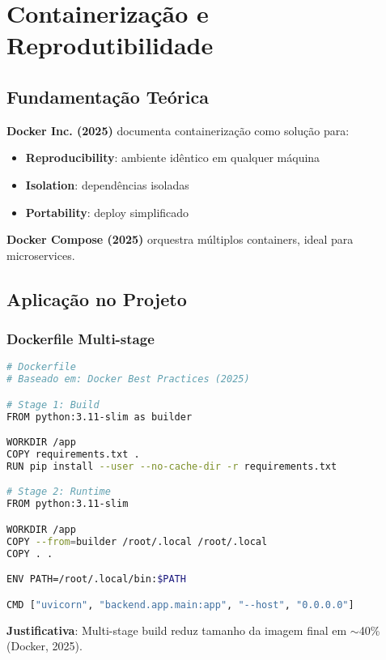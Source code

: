\documentclass[12pt,a4paper]{article}
\begin{document}
\section{Containerização e Reprodutibilidade}

\subsection{Fundamentação Teórica}

\textbf{Docker Inc. (2025)} documenta containerização como solução para:
\begin{itemize}
    \item \textbf{Reproducibility}: ambiente idêntico em qualquer máquina
    \item \textbf{Isolation}: dependências isoladas
    \item \textbf{Portability}: deploy simplificado
\end{itemize}

\textbf{Docker Compose (2025)} orquestra múltiplos containers, ideal para microservices.

\subsection{Aplicação no Projeto}

\subsubsection{Dockerfile Multi-stage}

\begin{lstlisting}[language=bash, caption=Dockerfile otimizado]
# Dockerfile
# Baseado em: Docker Best Practices (2025)

# Stage 1: Build
FROM python:3.11-slim as builder

WORKDIR /app
COPY requirements.txt .
RUN pip install --user --no-cache-dir -r requirements.txt

# Stage 2: Runtime
FROM python:3.11-slim

WORKDIR /app
COPY --from=builder /root/.local /root/.local
COPY . .

ENV PATH=/root/.local/bin:$PATH

CMD ["uvicorn", "backend.app.main:app", "--host", "0.0.0.0"]
\end{lstlisting}

\textbf{Justificativa}: Multi-stage build reduz tamanho da imagem final em $\sim$40\% (Docker, 2025).
\end{document}
